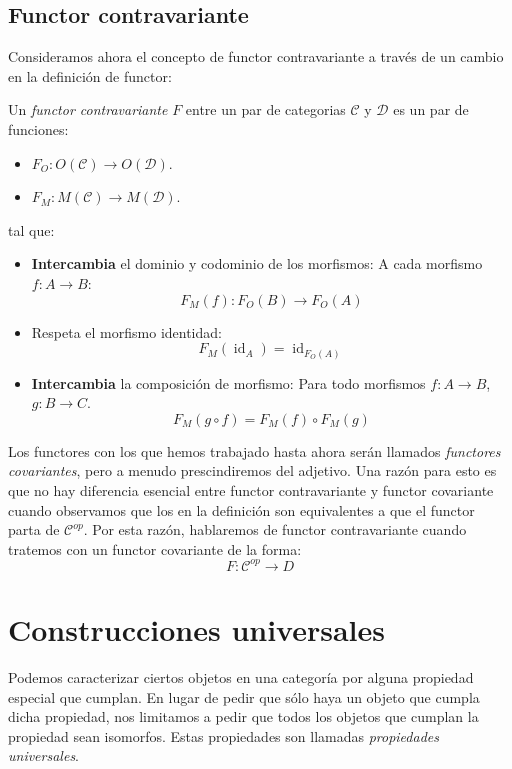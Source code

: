 \documentclass[12pt, twoside]{book}
\newcommand{\cat}{{\mathcal{C}}}
\DeclareMathOperator{\id}{id}
\begin{document}
\subsection{Functor contravariante}
Consideramos ahora el concepto de functor contravariante a través de un cambio en la definición de functor:
\begin{definition}\label{def:cofunctor}
Un \emph{functor contravariante} $F$ entre un par de categorias $\cat$ y $\mathcal{D}$ es un par de funciones:
\begin{itemize}
\item $F_O : O(\cat) \to O(\mathcal{D})$.
\item $F_M : M(\cat) \to M(\mathcal{D})$.
\end{itemize}
tal que:
\begin{itemize}
\item \textbf{Intercambia} el dominio y codominio de los morfismos: A cada morfismo $f : A \to B$:
\[ F_M(f) : F_O(B) \to F_O(A) \]
\item Respeta el morfismo identidad:
\[ F_M(\id_A) = \id_{F_O(A)} \]
\item \textbf{Intercambia} la composición de morfismo: Para todo morfismos $f : A \to B$, $g : B \to C$.
\[ F_M(g \circ f) = F_M(f) \circ F_M(g) \]
\end{itemize}
\end{definition}

Los functores con los que hemos trabajado hasta ahora serán llamados \emph{functores covariantes}, pero a menudo prescindiremos del adjetivo.
Una razón para esto es que no hay diferencia esencial entre functor contravariante y functor covariante cuando observamos que los  en la definición son equivalentes a que el functor parta de $\cat^{op}$.
Por esta razón, hablaremos de functor contravariante cuando tratemos con un functor covariante de la forma:
\[ F \colon \cat^{op} \to D \]

\section{Construcciones universales}
Podemos caracterizar ciertos objetos en una categoría por alguna propiedad especial que cumplan. En lugar de pedir que sólo haya un objeto que cumpla dicha propiedad, nos limitamos a pedir que todos los objetos que cumplan la propiedad sean isomorfos. Estas propiedades son llamadas \emph{propiedades universales}.
\end{document}
